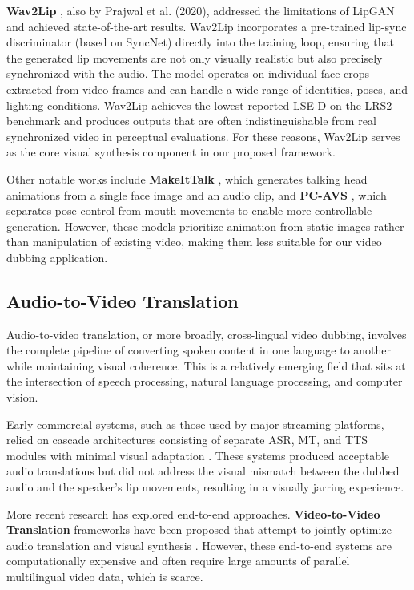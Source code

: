 \documentclass[conference]{IEEEtran}
\begin{document}
\textbf{Wav2Lip} \cite{b5}, also by Prajwal et al. (2020), addressed the limitations of LipGAN and achieved state-of-the-art results. Wav2Lip incorporates a pre-trained lip-sync discriminator (based on SyncNet) directly into the training loop, ensuring that the generated lip movements are not only visually realistic but also precisely synchronized with the audio. The model operates on individual face crops extracted from video frames and can handle a wide range of identities, poses, and lighting conditions. Wav2Lip achieves the lowest reported LSE-D on the LRS2 benchmark and produces outputs that are often indistinguishable from real synchronized video in perceptual evaluations. For these reasons, Wav2Lip serves as the core visual synthesis component in our proposed framework.

Other notable works include \textbf{MakeItTalk} \cite{b9}, which generates talking head animations from a single face image and an audio clip, and \textbf{PC-AVS} \cite{b10}, which separates pose control from mouth movements to enable more controllable generation. However, these models prioritize animation from static images rather than manipulation of existing video, making them less suitable for our video dubbing application.

\subsection{Audio-to-Video Translation}

Audio-to-video translation, or more broadly, cross-lingual video dubbing, involves the complete pipeline of converting spoken content in one language to another while maintaining visual coherence. This is a relatively emerging field that sits at the intersection of speech processing, natural language processing, and computer vision.

Early commercial systems, such as those used by major streaming platforms, relied on cascade architectures consisting of separate ASR, MT, and TTS modules with minimal visual adaptation \cite{b11}. These systems produced acceptable audio translations but did not address the visual mismatch between the dubbed audio and the speaker's lip movements, resulting in a visually jarring experience.

More recent research has explored end-to-end approaches. \textbf{Video-to-Video Translation} frameworks have been proposed that attempt to jointly optimize audio translation and visual synthesis \cite{b12}. However, these end-to-end systems are computationally expensive and often require large amounts of parallel multilingual video data, which is scarce.
\end{document}
